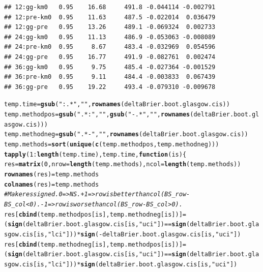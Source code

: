 \documentclass{article}\usepackage[]{graphicx}\usepackage[]{color}
\makeatletter
\newcommand{\hlnum}[1]{\textcolor[rgb]{0.686,0.059,0.569}{#1}}%
\newcommand{\hlstr}[1]{\textcolor[rgb]{0.192,0.494,0.8}{#1}}%
\newcommand{\hlcom}[1]{\textcolor[rgb]{0.678,0.584,0.686}{\textit{#1}}}%
\newcommand{\hlopt}[1]{\textcolor[rgb]{0,0,0}{#1}}%
\newcommand{\hlstd}[1]{\textcolor[rgb]{0.345,0.345,0.345}{#1}}%
\newcommand{\hlkwa}[1]{\textcolor[rgb]{0.161,0.373,0.58}{\textbf{#1}}}%
\newcommand{\hlkwb}[1]{\textcolor[rgb]{0.69,0.353,0.396}{#1}}%
\newcommand{\hlkwc}[1]{\textcolor[rgb]{0.333,0.667,0.333}{#1}}%
\newcommand{\hlkwd}[1]{\textcolor[rgb]{0.737,0.353,0.396}{\textbf{#1}}}%
\newenvironment{kframe}{%
 \def\at@end@of@kframe{}%
 \ifinner\ifhmode%
  \def\at@end@of@kframe{\end{minipage}}%
  \begin{minipage}{\columnwidth}%
 \fi\fi%
 \def\FrameCommand##1{\hskip\@totalleftmargin \hskip-\fboxsep
 \colorbox{shadecolor}{##1}\hskip-\fboxsep
     \hskip-\linewidth \hskip-\@totalleftmargin \hskip\columnwidth}%
 \MakeFramed {\advance\hsize-\width
   \@totalleftmargin\z@ \linewidth\hsize
   \@setminipage}}%
 {\par\unskip\endMakeFramed%
 \at@end@of@kframe}
\newenvironment{knitrout}{}{} %
\makeatother
\begin{document}
\begin{knitrout}
\begin{kframe}
\begin{verbatim}
## 12:gg-km0   0.95    16.68     491.8 -0.044114 -0.002791
## 12:pre-km0  0.95    11.63     487.5 -0.022014  0.036479
## 12:gg-pre   0.95    13.26     489.1 -0.069324  0.002733
## 24:gg-km0   0.95    11.13     486.9 -0.053063 -0.008089
## 24:pre-km0  0.95     8.67     483.4 -0.032969  0.054596
## 24:gg-pre   0.95    16.77     491.9 -0.082761  0.002474
## 36:gg-km0   0.95     9.75     485.4 -0.027364 -0.001529
## 36:pre-km0  0.95     9.11     484.4 -0.003833  0.067439
## 36:gg-pre   0.95    19.22     493.4 -0.079310 -0.009678
\end{verbatim}
\end{kframe}
\end{knitrout}


\begin{knitrout}
\color{fgcolor}\begin{kframe}
\begin{alltt}
\hlstd{temp.time} \hlkwb{=} \hlkwd{gsub}\hlstd{(}\hlstr{":.*"}\hlstd{,} \hlstr{""}\hlstd{,} \hlkwd{rownames}\hlstd{(deltaBrier.boot.glasgow.cis))}
\hlstd{temp.methodpos} \hlkwb{=} \hlkwd{gsub}\hlstd{(}\hlstr{".*:"}\hlstd{,} \hlstr{""}\hlstd{,} \hlkwd{gsub}\hlstd{(}\hlstr{"-.*"}\hlstd{,} \hlstr{""}\hlstd{,} \hlkwd{rownames}\hlstd{(deltaBrier.boot.glasgow.cis)))}
\hlstd{temp.methodneg} \hlkwb{=} \hlkwd{gsub}\hlstd{(}\hlstr{".*-"}\hlstd{,} \hlstr{""}\hlstd{,} \hlkwd{rownames}\hlstd{(deltaBrier.boot.glasgow.cis))}
\hlstd{temp.methods} \hlkwb{=} \hlkwd{sort}\hlstd{(}\hlkwd{unique}\hlstd{(}\hlkwd{c}\hlstd{(temp.methodpos, temp.methodneg)))}
\hlkwd{tapply}\hlstd{(}\hlnum{1}\hlopt{:}\hlkwd{length}\hlstd{(temp.time), temp.time,} \hlkwa{function}\hlstd{(}\hlkwc{is}\hlstd{) \{}
        \hlstd{res} \hlkwb{=} \hlkwd{matrix}\hlstd{(}\hlnum{0}\hlstd{,} \hlkwc{nrow} \hlstd{=} \hlkwd{length}\hlstd{(temp.methods),} \hlkwc{ncol} \hlstd{=} \hlkwd{length}\hlstd{(temp.methods))}
        \hlkwd{rownames}\hlstd{(res)} \hlkwb{=} \hlstd{temp.methods}
        \hlkwd{colnames}\hlstd{(res)} \hlkwb{=} \hlstd{temp.methods}
        \hlcom{# Make res signed.  0 => NS.  +1 => row is better than col (BS_row - BS_col < 0).  -1 => row is worse than col (BS_row - BS_col > 0).}
        \hlstd{res[}\hlkwd{cbind}\hlstd{(temp.methodpos[is], temp.methodneg[is])]} \hlkwb{=} \hlstd{(}\hlkwd{sign}\hlstd{(deltaBrier.boot.glasgow.cis[is,} \hlstr{"uci"}\hlstd{])} \hlopt{==} \hlkwd{sign}\hlstd{(deltaBrier.boot.glasgow.cis[is,} \hlstr{"lci"}\hlstd{]))} \hlopt{*} \hlkwd{sign}\hlstd{(}\hlopt{-}\hlstd{deltaBrier.boot.glasgow.cis[is,} \hlstr{"uci"}\hlstd{])}
        \hlstd{res[}\hlkwd{cbind}\hlstd{(temp.methodneg[is], temp.methodpos[is])]} \hlkwb{=} \hlstd{(}\hlkwd{sign}\hlstd{(deltaBrier.boot.glasgow.cis[is,} \hlstr{"uci"}\hlstd{])} \hlopt{==} \hlkwd{sign}\hlstd{(deltaBrier.boot.glasgow.cis[is,} \hlstr{"lci"}\hlstd{]))} \hlopt{*} \hlkwd{sign}\hlstd{(deltaBrier.boot.glasgow.cis[is,} \hlstr{"uci"}\hlstd{])}

\end{alltt}
\end{kframe}
\end{knitrout}
\end{document}
